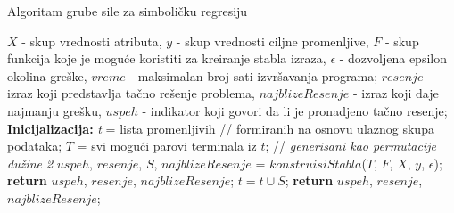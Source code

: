 \documentclass[main.tex]{subfiles}
\begin{document}
\begin{algorithm}
\caption{Algoritam grube sile za simboličku regresiju}
\label{alg:bruteForce}
  \begin{algorithmic}[1]
    \INPUT  $X$ - skup vrednosti atributa, $y$ - skup vrednosti ciljne promenljive, 
    $F$ - skup funkcija koje je moguće koristiti za kreiranje stabla izraza, $\epsilon$ - dozvoljena epsilon okolina greške, $vreme$ - maksimalan broj sati izvršavanja programa;
    \OUTPUT $resenje$ - izraz koji predstavlja tačno rešenje problema, $najblizeResenje$ - izraz koji daje najmanju grešku, $uspeh$ - indikator koji govori da li je pronadjeno tačno resenje;
    \STATE \textbf{Inicijalizacija:} ‎\textit{t} = lista promenljivih \color{gray}  // formiranih na osnovu ulaznog skupa podataka; \color{black} 
      \STATE $T$ = svi mogući parovi terminala iz $t$; \color{gray} // \textit{generisani kao permutacije dužine 2} \color{black}
      \STATE $uspeh$, $resenje$, $S$, $najblizeResenje$ = $konstruisiStabla$($T$, $F$, $X$, $y$, $\epsilon$);
        \STATE \textbf{return} $uspeh$, $resenje$, $najblizeResenje$;
      \ENDIF
      \STATE $t = t \cup S$;
    \ENDWHILE
    \STATE \textbf{return} $uspeh$, $resenje$, $najblizeResenje$;
  \end{algorithmic}
\end{algorithm}
\end{document}
